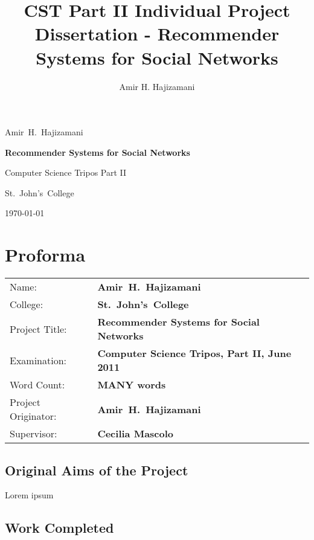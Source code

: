 \documentclass[a4paper,12pt,twoside,notitlepage,draft]{report}
\author{Amir H. Hajizamani}
\title{CST Part II Individual Project Dissertation - Recommender Systems for 
Social Networks}
\makeatletter
\def\projtitle{Recommender Systems for Social Networks}
\def\authorname{Amir~H.~Hajizamani}
\def\authoremail{\url{ahh29@cam.ac.uk}}
\def\authorcollege{St.~John's~College}
\makeatother
\begin{document}


\begin{flushright}
\authorname \\
\end{flushright}
\bigskip %

\vfill

\begin{center}
 \medskip
 {\Large\bf \projtitle}

 \vspace*{1cm}

 {\large Computer Science Tripos Part II}

 \bigskip

 {\large \authorcollege}

 \bigskip

 {\large \today}
\end{center}

\vfill
\vfill

\clearpage

\chapter*{Proforma}
{
\begin{tabular}{ll}
Name:               & \bf \authorname \\
College:            & \bf \authorcollege \\
Project Title:      & \bf \projtitle \\
Examination:        & \bf Computer Science Tripos, Part II, June 2011 \\
Word Count:         & \bf MANY words \\
Project Originator: & \bf Amir~H.~Hajizamani \\
Supervisor:         & \bf Cecilia Mascolo \\
\end{tabular}
}

\section*{Original Aims of the Project}

Lorem ipsum

\section*{Work Completed}
\end{document}
